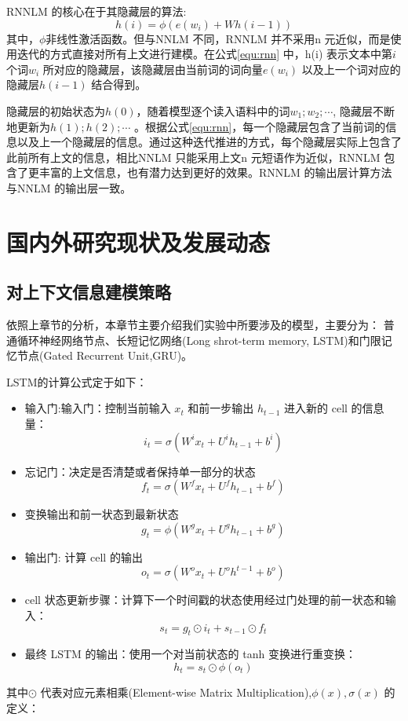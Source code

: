 \documentclass[12pt,a4paper]{article}
\begin{document}
RNNLM 的核心在于其隐藏层的算法:
\begin{equation}
\label{equ:rnn}
h(i) =\phi(e(w_i) +Wh(i -1))
\end{equation}
其中，$\phi$非线性激活函数。但与NNLM 不同，RNNLM 并不采用n 元近似，而是使用迭代的方式直接对所有上文进行建模。在公式\ref{equ:rnn} 中，h(i) 表示文本中第$i$ 个词$w_i$ 所对应的隐藏层，该隐藏层由当前词的词向量$e(w_i)$ 以及上一个词对应的隐藏层$h(i -1)$ 结合得到。

隐藏层的初始状态为$h(0)$，随着模型逐个读入语料中的词$w_1;w_2; \cdots $, 隐藏层不断地更新为$h(1);h(2); \cdots$ 。根据公式\ref{equ:rnn}，每一个隐藏层包含了当前词的信息以及上一个隐藏层的信息。通过这种迭代推进的方式，每个隐藏层实际上包含了此前所有上文的信息，相比NNLM 只能采用上文n 元短语作为近似，RNNLM 包含了更丰富的上文信息，也有潜力达到更好的效果。RNNLM 的输出层计算方法与NNLM 的输出层一致。


\section{国内外研究现状及发展动态}

\subsection{对上下文信息建模策略}
依照上章节的分析，本章节主要介绍我们实验中所要涉及的模型，主要分为： 普通循环神经网络节点、长短记忆网络(Long shrot-term memory, LSTM)和门限记忆节点(Gated Recurrent Unit,GRU)。

LSTM的计算公式定于如下：
\begin{itemize}
\item 输入门:输入门：控制当前输入 $x_t$ 和前一步输出 $h_{t−1}$ 进入新的 cell 的信息量：
$$i_t=\sigma(W^i x_t+U^i h_{t-1}+b^i)$$
\item  忘记门：决定是否清楚或者保持单一部分的状态
$$f_t=\sigma(W^f x_t+U^f h_{t-1}+b^f)$$
\item  变换输出和前一状态到最新状态
$$g_t=\phi(W^g x_t+U^g h_{t-1}+b^g)$$
\item  输出门: 计算 cell 的输出
$$o_t=\sigma(W^o x_t+U^o h^{t-1}+b^o)$$
\item  cell 状态更新步骤：计算下一个时间戳的状态使用经过门处理的前一状态和输入：
$$s_t=g_t\odot i_t+s_{t-1}\odot f_t$$
\item  最终 LSTM 的输出：使用一个对当前状态的 tanh 变换进行重变换：
$$h_t=s_t\odot \phi(o_t)$$
\end{itemize}
其中$\odot$ 代表对应元素相乘(Element-wise Matrix Multiplication),$\phi(x), \sigma(x)$ 的定义：
\end{document}
